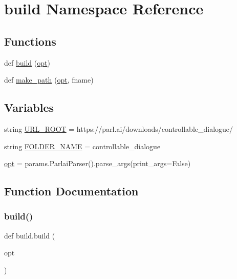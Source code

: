 \hypertarget{namespacebuild}{}\section{build Namespace Reference}
\label{namespacebuild}
\subsection*{Functions}
\begin{DoxyCompactItemize}
\item 
def \hyperlink{namespacebuild_ab7d657b0c6230339676639aadf69efe7}{build} (\hyperlink{namespacebuild_acdefcc58695b0ac3dac914e85bb8e8fc}{opt})
\item 
def \hyperlink{namespacebuild_a1b0dea9407e08660826abf8294ea4136}{make\+\_\+path} (\hyperlink{namespacebuild_acdefcc58695b0ac3dac914e85bb8e8fc}{opt}, fname)
\end{DoxyCompactItemize}
\subsection*{Variables}
\begin{DoxyCompactItemize}
\item 
string \hyperlink{namespacebuild_a9fd2022839d1cec94215f5d2b5c78895}{U\+R\+L\+\_\+\+R\+O\+OT} = \textquotesingle{}https\+://parl.\+ai/downloads/controllable\+\_\+dialogue/\textquotesingle{}
\item 
string \hyperlink{namespacebuild_ad7a8528768257a8dae5e4115d7653a4a}{F\+O\+L\+D\+E\+R\+\_\+\+N\+A\+ME} = \textquotesingle{}controllable\+\_\+dialogue\textquotesingle{}
\item 
\hyperlink{namespacebuild_acdefcc58695b0ac3dac914e85bb8e8fc}{opt} = params.\+Parlai\+Parser().parse\+\_\+args(print\+\_\+args=False)
\end{DoxyCompactItemize}


\subsection{Function Documentation}
\mbox{\label{namespacebuild_ab7d657b0c6230339676639aadf69efe7}} 
\subsubsection{\texorpdfstring{build()}{build()}}
{\footnotesize\ttfamily def build.\+build (\begin{DoxyParamCaption}\item[{}]{opt }\end{DoxyParamCaption})}



